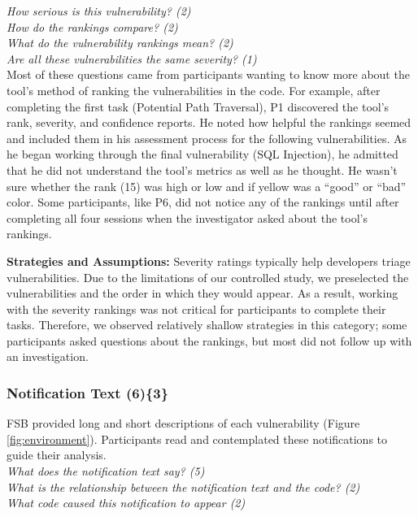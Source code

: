 \documentclass[10pt,journal,compsoc]{IEEEtran}
\begin{document}
\noindent\emph{How serious is this vulnerability? (2)} \\
\emph{How do the rankings compare? (2)} \\
\emph{What do the vulnerability rankings mean? (2)} \\
\emph{Are all these vulnerabilities the same severity? (1)}
\\
 
Most of these questions came from participants wanting to know more about the tool's method of ranking the vulnerabilities in the code.
For example, after completing the first task (Potential Path Traversal), P1 discovered the tool's rank, severity, and confidence reports. 
He noted how helpful the rankings seemed and included them in his assessment process for the following vulnerabilities.
As he began working through the final vulnerability (SQL Injection), he admitted that he did not understand the tool's metrics as well as he thought. 
He wasn't sure whether the rank (15) was high or low and if yellow was a ``good'' or ``bad'' color.
Some participants, like P6, did not notice any of the rankings until after completing all four sessions when the investigator asked about the tool's rankings.


\textbf{Strategies and Assumptions:}
Severity ratings typically help developers triage vulnerabilities.
Due to the limitations of our controlled study, we preselected the vulnerabilities and the order in which they would appear.
As a result, working with the severity rankings was not critical for participants to complete their tasks.
Therefore, we observed relatively shallow strategies in this category; some participants asked questions about the rankings, but most did not follow up with an investigation.

\subsubsection{Notification Text (6)\{3\}}\label{em}

FSB provided long and short descriptions of each vulnerability (Figure \ref{fig:environment}). 
Participants read and contemplated these notifications to guide their analysis.
\\

\noindent\emph{What does the notification text say? (5)} \\
\emph{What is the relationship between the notification text and the code? (2)} \\
\emph{What code caused this notification to appear (2)} 
\\
\end{document}
